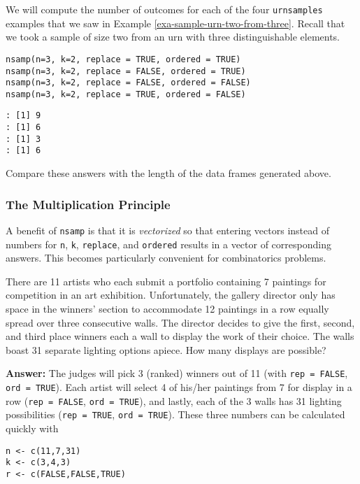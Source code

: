We will compute the number of outcomes for each of the four
\texttt{urnsamples} examples that we saw in Example
\ref{exa-sample-urn-two-from-three}. Recall that we took a sample of size two from an
urn with three distinguishable elements.


\begin{verbatim}
nsamp(n=3, k=2, replace = TRUE, ordered = TRUE) 
nsamp(n=3, k=2, replace = FALSE, ordered = TRUE) 
nsamp(n=3, k=2, replace = FALSE, ordered = FALSE) 
nsamp(n=3, k=2, replace = TRUE, ordered = FALSE) 
\end{verbatim}

\begin{verbatim}
: [1] 9
: [1] 6
: [1] 3
: [1] 6
\end{verbatim}

Compare these answers with the length of the data frames generated above.

\subsubsection{The Multiplication Principle}
\label{sec-4-5-2-2}

A benefit of \texttt{nsamp} is that it is \emph{vectorized} so that entering
vectors instead of numbers for \texttt{n}, \texttt{k}, \texttt{replace}, and \texttt{ordered}
results in a vector of corresponding answers. This becomes
particularly convenient for combinatorics problems.


There are 11 artists who each submit a portfolio containing 7
paintings for competition in an art exhibition. Unfortunately, the
gallery director only has space in the winners' section to accommodate
12 paintings in a row equally spread over three consecutive walls. The
director decides to give the first, second, and third place winners
each a wall to display the work of their choice. The walls boast 31
separate lighting options apiece. How many displays are possible?

\textbf{Answer:} The judges will pick 3 (ranked) winners out of 11 (with \texttt{rep
= FALSE}, \texttt{ord = TRUE}). Each artist will select 4 of his/her
paintings from 7 for display in a row (\texttt{rep = FALSE}, \texttt{ord = TRUE}),
and lastly, each of the 3 walls has 31 lighting possibilities (\texttt{rep =
TRUE}, \texttt{ord = TRUE}). These three numbers can be calculated quickly
with

\begin{verbatim}
n <- c(11,7,31) 
k <- c(3,4,3) 
r <- c(FALSE,FALSE,TRUE) 
\end{verbatim}


